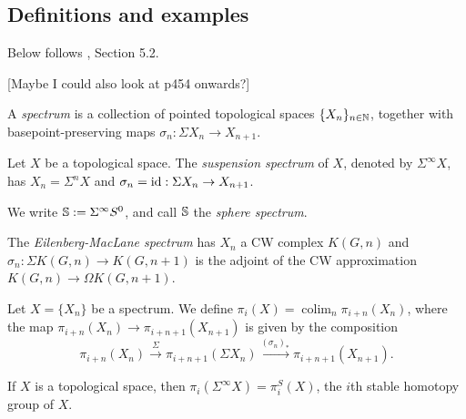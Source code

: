 \documentclass{MetricNotes2023}
\def\bb{\ensuremath\mathbb}
\def\nat{\ensuremath\mathbb{N}}
\def\id{\ensuremath\text{id}}
\DeclareMathOperator{\colim}{colim}
\begin{document}
\subsection{Definitions and examples}

Below follows \autocite{hatcher5}, Section 
5.2.

[Maybe I could also look at \autocite{hatcher} p454 onwards?]

\begin{definition}
A \textit{spectrum} is a collection of pointed topological spaces \(\{X_n\}_{n\in \nat}\), together with basepoint-preserving maps \(\sigma_n : \Sigma X_n \to X_{n+1}\).
\end{definition}

\begin{example}
Let \(X\) be a topological space. The \textit{suspension spectrum} of \(X\), denoted by \(\Sigma^\infty X\), has \(X_n=\Sigma^nX\) and \(\sigma_n=\id : \Sigma X_n \to X_{n+1}\).
\end{example}

We write \(\bb{S}:=\Sigma^\infty S^0\), and call \(\bb{S}\) the \textit{sphere spectrum}. 

\begin{example}
The \textit{Eilenberg-MacLane spectrum} has \(X_n\) a CW complex \(K(G,n)\) and \(\sigma_n : \Sigma K(G,n)\to K(G,n+1)\) is the adjoint of the CW approximation \(K(G, n)\to \Omega K(G,n+1)\).
\end{example}


\begin{definition}
Let \(X=\{X_n\}\) be a spectrum. We define \(\pi_i(X)=\colim_n \pi_{i+n}(X_n)\), where the map \(\pi_{i+n}(X_n)\to \pi_{i+n+1}(X_{n+1})\) is given by the composition
\[\pi_{i+n}(X_n)\xrightarrow{\Sigma}\pi_{i+n+1}(\Sigma X_n)\xrightarrow{(\sigma_n)_*}\pi_{i+n+1}(X_{n+1}).\]
\end{definition}

\begin{example}
If \(X\) is a topological space, then \(\pi_i(\Sigma^\infty X)=\pi_i^S(X)\), the \(i\)th stable homotopy group of \(X\). 
\end{example}
\end{document}
